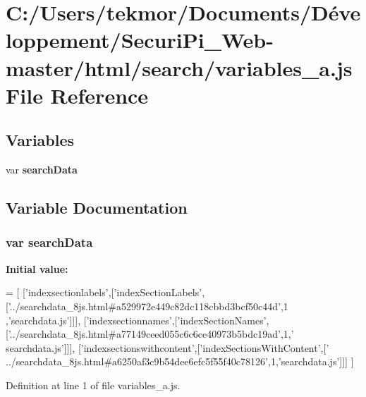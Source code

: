 \section{C\+:/\+Users/tekmor/\+Documents/\+Développement/\+Securi\+Pi\+\_\+\+Web-\/master/html/search/variables\+\_\+a.js File Reference}
\label{variables__a_8js}
\subsection*{Variables}
\begin{DoxyCompactItemize}
\item 
var {\bf search\+Data}
\end{DoxyCompactItemize}


\subsection{Variable Documentation}
\subsubsection[{search\+Data}]{\setlength{\rightskip}{0pt plus 5cm}var search\+Data}\label{variables__a_8js_ad01a7523f103d6242ef9b0451861231e}
{\bfseries Initial value\+:}
\begin{DoxyCode}
=
[
  [\textcolor{stringliteral}{'indexsectionlabels'},[\textcolor{stringliteral}{'indexSectionLabels'},[\textcolor{stringliteral}{'../searchdata\_8js.html#a529972e449c82dc118cbbd3bcf50c44d'},1
      ,\textcolor{stringliteral}{'searchdata.js'}]]],
  [\textcolor{stringliteral}{'indexsectionnames'},[\textcolor{stringliteral}{'indexSectionNames'},[\textcolor{stringliteral}{'../searchdata\_8js.html#a77149ceed055c6c6ce40973b5bdc19ad'},1,\textcolor{stringliteral}{'
      searchdata.js'}]]],
  [\textcolor{stringliteral}{'indexsectionswithcontent'},[\textcolor{stringliteral}{'indexSectionsWithContent'},[\textcolor{stringliteral}{'
      ../searchdata\_8js.html#a6250af3c9b54dee6efc5f55f40c78126'},1,\textcolor{stringliteral}{'searchdata.js'}]]]
]
\end{DoxyCode}


Definition at line 1 of file variables\+\_\+a.\+js.

